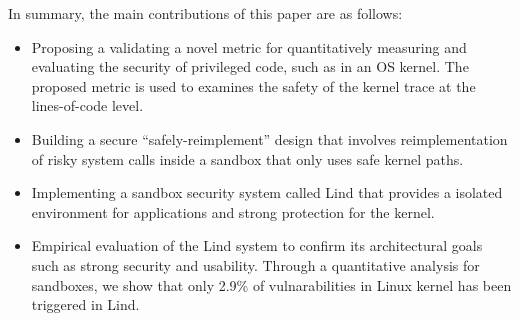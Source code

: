 
In summary, %
the main contributions of this paper are as follows: %
\begin{itemize}
\item %
Proposing a validating a novel metric for quantitatively measuring and
evaluating the security of privileged code, such as in an OS kernel.
The proposed metric is used to examines the safety of the kernel trace at the lines-of-code level.



\item %
Building a secure ``safely-reimplement'' design that
involves reimplementation of risky system calls inside a
sandbox that only uses safe kernel paths.

\item %

Implementing a sandbox security system called Lind
that provides a isolated environment for applications and strong protection for the kernel.

\item Empirical evaluation of the Lind system to confirm its architectural goals such as strong security and usability. Through a quantitative analysis for sandboxes, we show that only 2.9\% of vulnarabilities in Linux kernel has been triggered in Lind.


\end{itemize}

